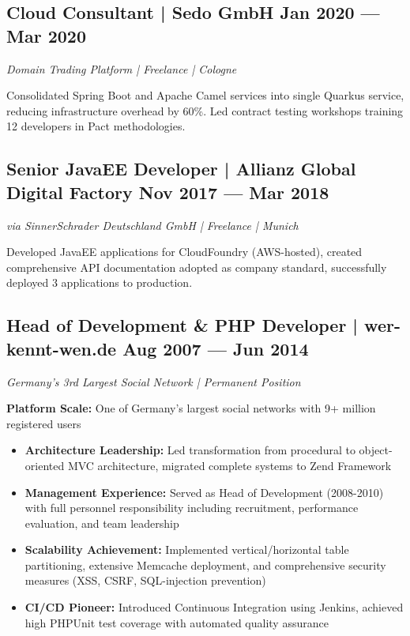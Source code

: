 \documentclass[10pt,a4paper]{article}
\begin{document}
\vspace{4pt}

\subsection{Cloud Consultant | Sedo GmbH \hfill Jan 2020 --- Mar 2020}
\textit{Domain Trading Platform | Freelance | Cologne}

Consolidated Spring Boot and Apache Camel services into single Quarkus service, reducing infrastructure overhead by 60\%. Led contract testing workshops training 12 developers in Pact methodologies.

\vspace{4pt}

\subsection{Senior JavaEE Developer | Allianz Global Digital Factory \hfill Nov 2017 --- Mar 2018}
\textit{via SinnerSchrader Deutschland GmbH | Freelance | Munich}

Developed JavaEE applications for CloudFoundry (AWS-hosted), created comprehensive API documentation adopted as company standard, successfully deployed 3 applications to production.

\vspace{4pt}

\subsection{Head of Development \& PHP Developer | wer-kennt-wen.de \hfill Aug 2007 --- Jun 2014}
\textit{Germany's 3rd Largest Social Network | Permanent Position}

\textbf{Platform Scale:} One of Germany's largest social networks with 9+ million registered users
\begin{itemize}
\item \textbf{Architecture Leadership:} Led transformation from procedural to object-oriented MVC architecture, migrated complete systems to Zend Framework
\item \textbf{Management Experience:} Served as Head of Development (2008-2010) with full personnel responsibility including recruitment, performance evaluation, and team leadership
\item \textbf{Scalability Achievement:} Implemented vertical/horizontal table partitioning, extensive Memcache deployment, and comprehensive security measures (XSS, CSRF, SQL-injection prevention)
\item \textbf{CI/CD Pioneer:} Introduced Continuous Integration using Jenkins, achieved high PHPUnit test coverage with automated quality assurance
\end{itemize}
\end{document}
